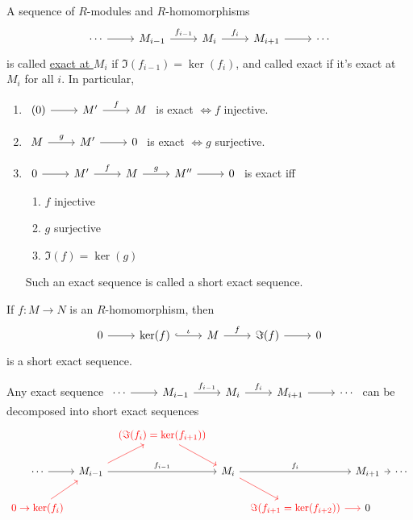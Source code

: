 \documentclass[x11names,reqno,14pt]{extarticle}
\begin{document}

A sequence of $R$-modules and $R$-homomorphisms 
\[
\begin{tikzcd}
\cdots\ar[r]&M_{i - 1}\ar[r, "f_{i - 1}"]& M_i\ar[r, "f_i"] & M_{i + 1} \ar[r] &\cdots 
\end{tikzcd}
\]
is called \underline{exact at $M_i$} if $\Im(f_{i - 1}) = \ker(f_i)$, and called exact if it's exact at $M_i$ for all $i$. In particular, 
\begin{enumerate}

\item $\begin{tikzcd} (0)\ar[r]&M'\ar[r, "f"]&M\end{tikzcd}$ is exact $\iff f$ injective.

\item $\begin{tikzcd} M\ar[r, "g"]&M'\ar[r]&0\end{tikzcd}$ is exact $\iff g$ surjective. 

\item $\exactshort{M'}{f}{M}{g}{M''}$ is exact iff
\begin{enumerate}[label=(\roman*)]

\item $f$ injective

\item $g$ surjective

\item $\Im(f) = \ker(g)$

\end{enumerate}
Such an exact sequence is called a short exact sequence. 

\end{enumerate}

\exm

If $f:M\to N$ is an $R$-homomorphism, then 
\[
\begin{tikzcd}
0\ar[r]&\ker(f)\ar[r, hook, "\iota"]&M\ar[r, "f"] &\Im(f)\ar[r]&0 \end{tikzcd}
\]
is a short exact sequence. 

\rem 

Any exact sequence $\begin{tikzcd} \cdots\ar[r]&M_{i - 1}\ar[r, "f_{i - 1}"]&M_i\ar[r, "f_i"]&M_{i + 1} \ar[r]&\cdots \end{tikzcd}$
can be decomposed into short exact sequences
\[
\begin{tikzcd}[column sep = tiny]
& &\color{red}{(\Im(f_i) = \ker(f_{i + 1}))} \ar[rd, red]  \\
 \cdots\ar[r] & M_{i - 1}\ar[ru, red]\ar[rr, "f_{i - 1}"] && M_i\ar[rr, "f_i"]\ar[dr, red] && M_{i + 1} \ar[r] & \cdots \\
\color{red}{0\to\ker(f_i)}\ar[ru, red] & & & & \color{red}{\Im(f_{i + 1} = \ker(f_{i + 2}))}\ar[r, red]& 0 \\
\end{tikzcd}
\]
\end{document}
